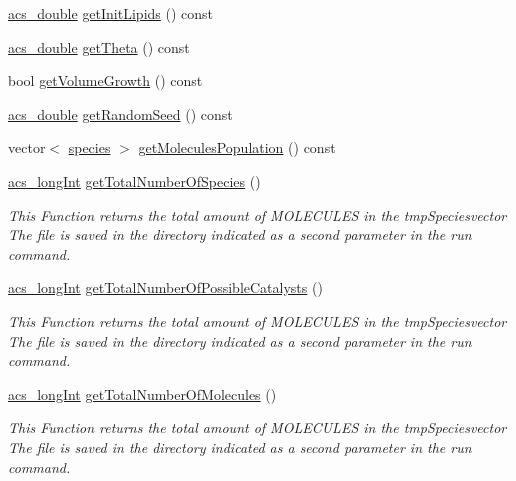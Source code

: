 \begin{DoxyCompactItemize}
\item 
\hyperlink{a00016_ab776853a005fcbf56af0424a2a4dd607}{acs\-\_\-double} \hyperlink{a00003_a94a7b04aea7b0b16735538028516bdd3}{get\-Init\-Lipids} () const 
\item 
\hyperlink{a00016_ab776853a005fcbf56af0424a2a4dd607}{acs\-\_\-double} \hyperlink{a00003_adb5b964f625b9e9a85b9b44b7a42682b}{get\-Theta} () const 
\item 
bool \hyperlink{a00003_a5e8b4ea54224563343199a15f68dee8a}{get\-Volume\-Growth} () const 
\item 
\hyperlink{a00016_ab776853a005fcbf56af0424a2a4dd607}{acs\-\_\-double} \hyperlink{a00003_ab6952f7f6fd971ece0a8661733cfc2b3}{get\-Random\-Seed} () const 
\item 
vector$<$ \hyperlink{a00014}{species} $>$ \hyperlink{a00003_adb12eb52af74ea1fdfe0cd195109fe83}{get\-Molecules\-Population} () const 
\item 
\hyperlink{a00016_a19319d75f02db4308bc5c0026d98cd85}{acs\-\_\-long\-Int} \hyperlink{a00003_a7a321296874fa1320da225cdbbf56a64}{get\-Total\-Number\-Of\-Species} ()
\begin{DoxyCompactList}\small\item\em This Function returns the total amount of M\-O\-L\-E\-C\-U\-L\-E\-S in the tmp\-Speciesvector The file is saved in the directory indicated as a second parameter in the run command. \end{DoxyCompactList}\item 
\hyperlink{a00016_a19319d75f02db4308bc5c0026d98cd85}{acs\-\_\-long\-Int} \hyperlink{a00003_a8796aead7bcc4a3f91eec7bc908dfa5b}{get\-Total\-Number\-Of\-Possible\-Catalysts} ()
\begin{DoxyCompactList}\small\item\em This Function returns the total amount of M\-O\-L\-E\-C\-U\-L\-E\-S in the tmp\-Speciesvector The file is saved in the directory indicated as a second parameter in the run command. \end{DoxyCompactList}\item 
\hyperlink{a00016_a19319d75f02db4308bc5c0026d98cd85}{acs\-\_\-long\-Int} \hyperlink{a00003_a57e7ac49955f4717096cb6696ee03a61}{get\-Total\-Number\-Of\-Molecules} ()
\begin{DoxyCompactList}\small\item\em This Function returns the total amount of M\-O\-L\-E\-C\-U\-L\-E\-S in the tmp\-Speciesvector The file is saved in the directory indicated as a second parameter in the run command. \end{DoxyCompactList}\item 

\end{DoxyCompactItemize}
